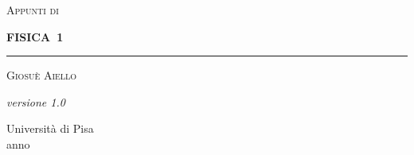 \begin{titlepage}
  \centering
  \vspace*{3.4cm}
  {\Large\scshape\color{notedarkred}Appunti di\par}
  \vspace{-0.6cm}
  {\fontsize{78}{85}\selectfont\bfseries\color{notered}FISICA\ {\color{notedarkred}1}\par}
  \vspace{1cm}
  {\color{notered}\rule{8cm}{1.2pt}\par}
  \vspace{1.2cm}
  {\Large\scshape Giosu\`e Aiello\par}
  \vfill
  \noindent
  \begin{minipage}[b]{0.5\linewidth}
    \textit{versione 1.0}
  \end{minipage}%
  \begin{minipage}[b]{0.5\linewidth}
    \raggedleft
    Universit\`a di Pisa\\
    anno \myTime
  \end{minipage}
  \thispagestyle{empty}
  \restoregeometry
\end{titlepage}
